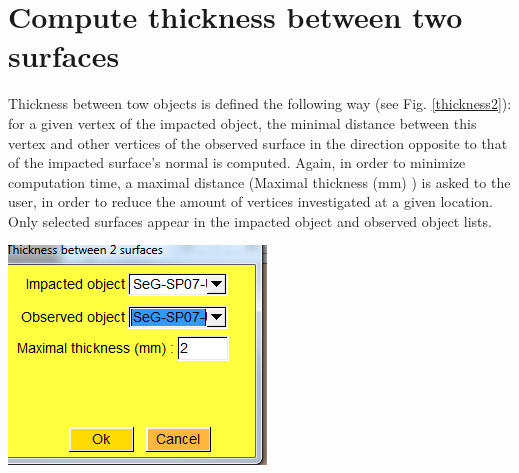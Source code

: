 \section{Compute thickness between two surfaces}

\noindent
\begin{minipage}{0.5\textwidth}
Thickness between tow objects is defined the following way (see Fig. \ref{thickness2}):
for a given vertex of the impacted object, the minimal distance
between this vertex and other vertices of the observed surface in
the direction opposite to that of the impacted surface's normal
is computed. Again, in order to minimize computation time, a
maximal distance (Maximal thickness (mm) ) is asked to the user,
in order to reduce the amount of vertices investigated at a given
location. Only selected surfaces appear in the impacted object
and observed object lists.
\end{minipage}    
\begin{minipage}{0.5\textwidth}\centering
  \includegraphics[scale=0.5]{images/Scalars_renreding/Thickness_window2.png}
\label{thickness_window2}
 \end{minipage} 
\noindent


